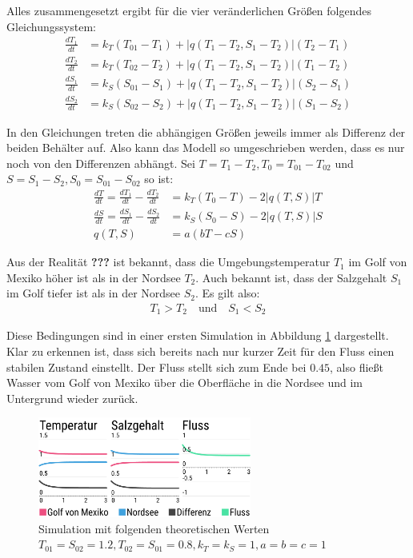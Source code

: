 \documentclass[a4paper,twoside]{article}
\begin{document}
	Alles zusammengesetzt ergibt für die vier veränderlichen Größen folgendes Gleichungssystem:
	\begin{align*}
		\frac{dT_1}{dt} &= k_T\left(T_{01} - T_1\right) + \left|q(T_1 - T_2,S_1 - T_2)\right|\left(T_2 - T_1\right) \\
		\frac{dT_2}{dt} &= k_T\left(T_{02} - T_2\right) + \left|q(T_1 - T_2,S_1 - T_2)\right|\left(T_1 - T_2\right) \\
		\frac{dS_1}{dt} &= k_S\left(S_{01} - S_1\right) + \left|q(T_1 - T_2,S_1 - T_2)\right|\left(S_2 - S_1\right) \\
		\frac{dS_2}{dt} &= k_S\left(S_{02} - S_2\right) + \left|q(T_1 - T_2,S_1 - T_2)\right|\left(S_1 - S_2\right)
	\end{align*}
	 
	 In den Gleichungen treten die abhängigen Größen jeweils immer als Differenz der beiden Behälter auf. Also kann das Modell so umgeschrieben werden, dass es nur noch von den Differenzen abhängt. Sei \(T = T_1 - T_2, T_0 = T_{01} - T_{02}\) und \(S = S_1 - S_2, S_0 = S_{01} - S_{02}\)  so ist:
	 \begin{align*}
	 	\frac{dT}{dt} = \frac{dT_1}{dt} - \frac{dT_2}{dt} &= k_T\left(T_{0} - T\right) - 2\left|q(T,S)\right|T \\
	 	\frac{dS}{dt} = \frac{dS_1}{dt} - \frac{dS_2}{dt} &= k_S\left(S_{0} - S\right) - 2\left|q(T,S)\right|S \\
	 	q(T,S) &= a\left(bT - cS\right)
	 \end{align*}
	  
	Aus der Realität \textbf{???} ist bekannt, dass die Umgebungstemperatur \(T_1\) im Golf von Mexiko höher ist als in der Nordsee \(T_2\). Auch bekannt ist, dass der Salzgehalt \(S_1\) im Golf tiefer ist als in der Nordsee \(S_2\). Es gilt also:
	\begin{align*}
		T_1 > T_2 \quad \textrm{und} \quad S_1 < S_2
	\end{align*}
	
	Diese Bedingungen sind in einer ersten Simulation in Abbildung \ref{fig:modell_q_pos} dargestellt. Klar zu erkennen ist, dass sich bereits nach nur kurzer Zeit für den Fluss einen stabilen Zustand einstellt. Der Fluss stellt sich zum Ende bei \(0.45\), also fließt Wasser vom Golf von Mexiko über die Oberfläche in die Nordsee und im Untergrund wieder zurück.
	
	\begin{figure}[!h]
  		\centering
 		\includegraphics[width=7cm]{../Diagramme/temp-salt-flow_q-pos.png}
  		\caption{Simulation mit folgenden theoretischen Werten \(T_{01} = S_{02} = 1.2, T_{02} = S_{01} = 0.8, k_T = k_S = 1, a = b = c = 1\)}
  		\label{fig:modell_q_pos}
	\end{figure}
	
\end{document}
